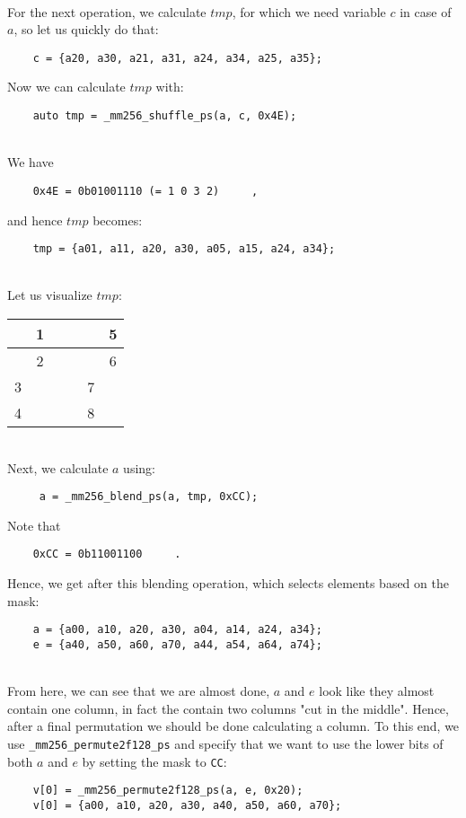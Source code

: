 \documentclass[../../main.tex]{subfiles}
\begin{document}
~\\
For the next operation, we calculate $tmp$, for which we need variable $c$ in case of $a$, so let us quickly do that:
\begin{lstlisting}
    c = {a20, a30, a21, a31, a24, a34, a25, a35};
\end{lstlisting}
Now we can calculate $tmp$ with:
\begin{lstlisting}
    auto tmp = _mm256_shuffle_ps(a, c, 0x4E);
\end{lstlisting}

~\\
We have
\begin{verbatim}
    0x4E = 0b01001110 (= 1 0 3 2)     ,
\end{verbatim}
and hence $tmp$ becomes:
\begin{lstlisting}
    tmp = {a01, a11, a20, a30, a05, a15, a24, a34};
\end{lstlisting}

~\\
Let us visualize $tmp$:

\begin{table}[h]
    \begin{tabular}{c|c|c|c|c|c}
        &1&&&&5\\
        \hline
        &2&&&&6\\
        \hline
        3&&&&7&\\
        \hline
        4&&&&8&
    \end{tabular}
\end{table}

~\\
Next, we calculate $a$ using:
\begin{lstlisting}
     a = _mm256_blend_ps(a, tmp, 0xCC);
\end{lstlisting}
Note that
\begin{verbatim}
    0xCC = 0b11001100     .
\end{verbatim}
Hence, we get after this blending operation, which selects elements based on the mask:
\begin{lstlisting}
    a = {a00, a10, a20, a30, a04, a14, a24, a34};
    e = {a40, a50, a60, a70, a44, a54, a64, a74};
\end{lstlisting}

~\\
From here, we can see that we are almost done, $a$ and $e$ look like they almost contain one column, in fact the contain two columns "cut in the middle". Hence, after a final permutation we should be done calculating a column. To this end, we use \texttt{\_mm256\_permute2f128\_ps} and specify that we want to use the lower bits of both $a$ and $e$ by setting the mask to \texttt{CC}:
\begin{lstlisting}
    v[0] = _mm256_permute2f128_ps(a, e, 0x20);
    v[0] = {a00, a10, a20, a30, a40, a50, a60, a70};
\end{lstlisting}
\end{document}
